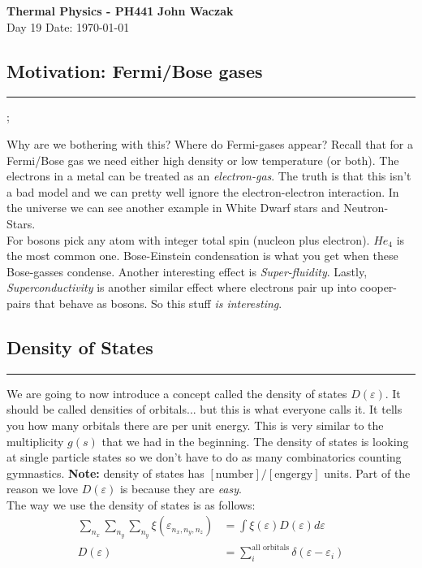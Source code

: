 \documentclass[a4paper, 11pt]{article}
\begin{document}
	\noindent
	\large\textbf{Thermal Physics - PH441} \hfill \textbf{John Waczak} \\
	\normalsize Day 19 \hfill  Date: \today \\
	
	
	
	
\subsection*{Motivation: Fermi/Bose gases} 
	\par\noindent\rule{\textwidth}{0.4pt}; 
	
	\noindent Why are we bothering with this? Where do Fermi-gases appear? Recall that for a Fermi/Bose gas we need either high density or low temperature (or both). The electrons in a metal can be treated as an \textit{electron-gas}. The truth is that this isn't a bad model and we can pretty well ignore the electron-electron interaction. In the universe we can see another example in White Dwarf stars and Neutron-Stars. \\
	
	\noindent For bosons pick any atom with integer total spin (nucleon plus electron). $He_4$ is the most common one. Bose-Einstein condensation is what you get when these Bose-gasses condense. Another interesting effect is \textit{Super-fluidity}. Lastly, \textit{Superconductivity} is another similar effect where electrons pair up into cooper-pairs that behave as bosons. So this stuff \textit{is interesting}. 
	
\subsection*{Density of States} 		
	\par\noindent\rule{\textwidth}{0.4pt}
	We are going to now introduce a concept called the density of states $D(\varepsilon)$. It should be called densities of orbitals... but this is what everyone calls it. It tells you how many orbitals there are per unit energy. This is very similar to the multiplicity $g(s)$ that we had in the beginning. The density of states is looking at single particle states so we don't have to do as many combinatorics counting gymnastics. \textbf{Note:} density of states has $[\text{number}]/[\text{engergy}]$ units. Part of the reason we love $D(\varepsilon)$ is because they are \textit{easy}. \\ 
	
	\noindent The way we use the density of states is as follows: 
		\begin{align*}
			\sum\limits_{n_x}\sum\limits_{n_y}\sum\limits_{n_y}\xi(\varepsilon_{n_x, n_y, n_z}) &= \int \xi(\varepsilon)D(\varepsilon)d\varepsilon\\ 
			D(\varepsilon) &= \sum\limits_i^{\text{all orbitals}} \delta(\varepsilon-\varepsilon_i)
		\end{align*}
	
\end{document}
